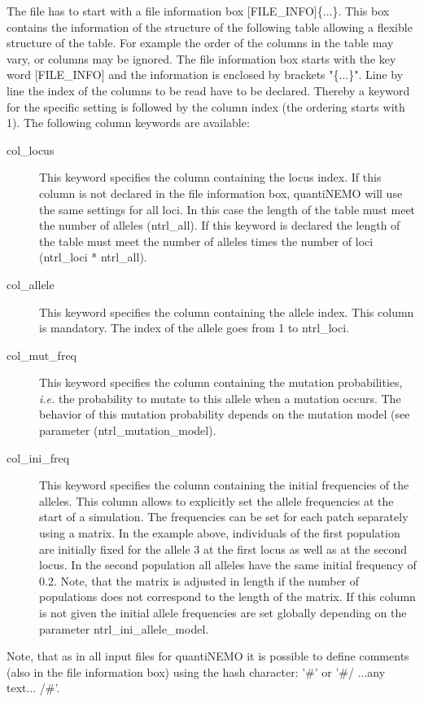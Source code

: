 \documentclass[letterpaper,12pt,oneside]{book}
\begin{document}
\begin{description}
The file has to start with a file information box \textsf{[FILE\_INFO]}\{...\}. This box contains the information of the structure of the following table allowing a flexible structure of the table. For example the order of the columns in the table may vary, or columns may be ignored. The file information box starts with the key word \textsf{[FILE\_INFO]} and the information is enclosed by brackets "\{...\}". Line by line the index of the columns to be read have to be declared. Thereby a keyword for the specific setting is followed by the column index (the ordering starts with 1). The following column keywords are available:
\begin{description}
\item [col\_locus] This keyword specifies the column containing the locus index. If this column is not declared in the file information box, quantiNEMO will use the same settings for all loci. In this case the length of the table must meet the number of alleles (\textsf{ntrl\_all}). If this keyword is declared the length of the table must meet the number of alleles times the number of loci (\textsf{ntrl\_loci} * \textsf{ntrl\_all}).   
\item [col\_allele] This keyword specifies the column containing the allele index. This column is mandatory. The index of the allele goes from 1 to \textsf{ntrl\_loci}.
\item [col\_mut\_freq] This keyword specifies the column containing the mutation probabilities, \textit{i.e.} the probability to mutate to this allele when a mutation occurs. The behavior of this mutation probability depends on the mutation model (see parameter (\textsf{ntrl\_mutation\_model}).
\item [col\_ini\_freq] This keyword specifies the column containing the initial frequencies of the alleles. This column allows to explicitly set the allele frequencies at the start of a simulation. The frequencies can be set for each patch separately using a matrix. In the example above, individuals of the first population are initially fixed for the allele 3 at the first locus as well as at the second locus. In the second population all alleles have the same initial frequency of 0.2. Note, that the matrix is adjusted in length if the number of populations does not correspond to the length of the matrix. If this column is not given the initial allele frequencies are set globally depending on the parameter \textsf{ntrl\_ini\_allele\_model}.
\end{description} 
Note, that as in all input files for quantiNEMO it is possible to define comments (also in the file information box) using the hash character: '\#' or '\#/ ...any text... /\#'.
\end{description}
\end{document}
